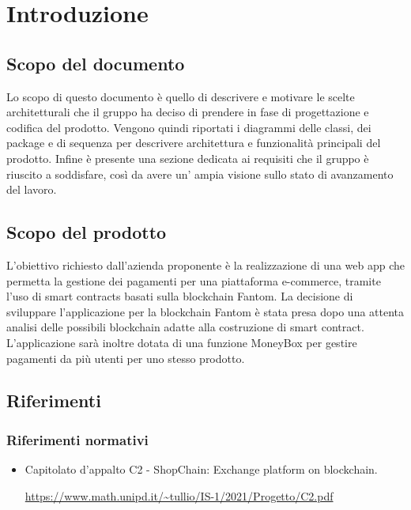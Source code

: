\section{Introduzione}\label{section:introduzione}
\subsection{Scopo del documento}
Lo scopo di questo documento è quello di descrivere e motivare le scelte architetturali che il gruppo \groupName{} ha deciso di prendere in fase di progettazione e codifica del prodotto.
Vengono quindi riportati i diagrammi delle classi, dei package e di sequenza per descrivere architettura e funzionalità principali del prodotto. Infine è presente una sezione dedicata ai requisiti che il gruppo \groupName{} è riuscito a soddisfare, così da avere un' ampia visione sullo stato di avanzamento del lavoro.
\subsection{Scopo del prodotto}
L'obiettivo richiesto dall'azienda proponente è la realizzazione di una web app\glo{} che permetta la gestione dei pagamenti per una piattaforma e-commerce\glo{}, tramite l'uso di smart contracts\glo{} basati sulla blockchain\glo{} Fantom\glo{}.
La decisione di sviluppare l'applicazione per la blockchain\glo{} Fantom\glo{} è stata presa dopo una attenta analisi delle possibili blockchain\glo{} adatte alla costruzione di smart contract\glo{}.
L'applicazione sarà inoltre dotata di una funzione MoneyBox\glo{} per gestire pagamenti da più utenti per uno stesso prodotto.

\subsection{Riferimenti}
\subsubsection{Riferimenti normativi}
\begin{itemize}
    \item Capitolato d'appalto C2 - ShopChain: Exchange platform on blockchain.
    \begin{center}
        \url{https://www.math.unipd.it/~tullio/IS-1/2021/Progetto/C2.pdf}
    \end{center}
    \end{itemize} 

